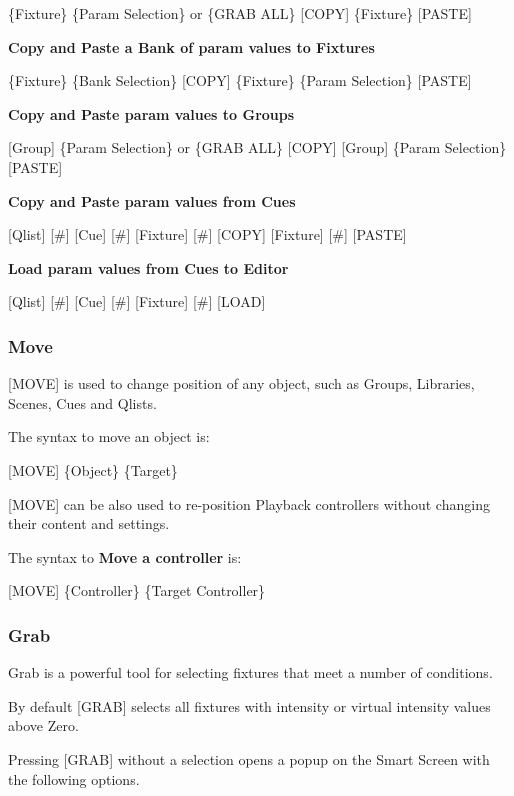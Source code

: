 \documentclass[
]{article}
\begin{document}
\{Fixture\} \{Param Selection\} or \{GRAB ALL\} {[}COPY{]} \{Fixture\} {[}PASTE{]}

\textbf{Copy and Paste a Bank of param values to Fixtures}

\{Fixture\} \{Bank Selection\} {[}COPY{]} \{Fixture\} \{Param Selection\} {[}PASTE{]}

\textbf{Copy and Paste param values to Groups}

{[}Group{]} \{Param Selection\} or \{GRAB ALL\} {[}COPY{]} {[}Group{]} \{Param Selection\} {[}PASTE{]}

\textbf{Copy and Paste param values from Cues}

{[}Qlist{]} {[}\#{]} {[}Cue{]} {[}\#{]} {[}Fixture{]} {[}\#{]} {[}COPY{]} {[}Fixture{]} {[}\#{]} {[}PASTE{]}

\textbf{Load param values from Cues to Editor}

{[}Qlist{]} {[}\#{]} {[}Cue{]} {[}\#{]} {[}Fixture{]} {[}\#{]} {[}LOAD{]}

\hypertarget{move}{%
\subsubsection{Move}\label{move}}

{[}MOVE{]} is used to change position of any object, such as Groups, Libraries, Scenes, Cues and Qlists.

The syntax to move an object is:

{[}MOVE{]} \{Object\} \{Target\}

{[}MOVE{]} can be also used to re-position Playback controllers without changing their content and settings.

The syntax to \textbf{Move a controller} is:

{[}MOVE{]} \{Controller\} \{Target Controller\}

\hypertarget{grab}{%
\subsubsection{Grab}\label{grab}}

Grab is a powerful tool for selecting fixtures that meet a number of conditions.

By default {[}GRAB{]} selects all fixtures with intensity or virtual intensity values above Zero.

Pressing {[}GRAB{]} without a selection opens a popup on the Smart Screen with the following options.
\end{document}
